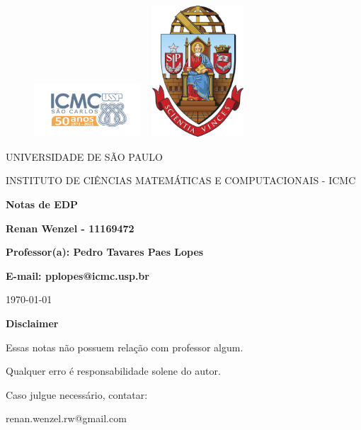 \documentclass[12pt]{article}
\theoremstyle{definition}
\begin{document}
\begin{figure}[ht]
	\includegraphics[width=4cm]{../icmc.png}
	\hspace{7cm}
	\includegraphics[height=4.9cm,width=4cm]{../brasao_usp_cor.jpg}
	\endminipage
\end{figure}

\begin{center}
	\vspace{1cm}
	\LARGE
	UNIVERSIDADE DE SÃO PAULO

	\vspace{1.3cm}
	\LARGE
	INSTITUTO DE CIÊNCIAS MATEMÁTICAS E COMPUTACIONAIS - ICMC

	\vspace{1.7cm}
	\Large
	\textbf{Notas de EDP}

	\vspace{1.3cm}
	\large
	\textbf{Renan Wenzel - 11169472}

	\vspace{1.3cm}
	\large
	\textbf{Professor(a): Pedro Tavares Paes Lopes}

	\textbf{E-mail: pplopes@icmc.usp.br}

	\vspace{1.3cm}
	\today
\end{center}

\newpage
\textbf{{\Huge Disclaimer}}

{\huge Essas notas não possuem relação com professor algum.

	Qualquer erro é responsabilidade solene do autor.

	Caso julgue necessário, contatar:

	renan.wenzel.rw@gmail.com}
\tableofcontents

\newpage
\end{document}
